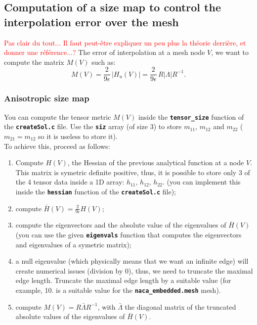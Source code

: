 \documentclass{article}
\newcommand{\ttb}[1]{\texttt{\textbf{#1}}}
\begin{document}
\subsection{Computation of a size map to control the interpolation error over the mesh}

\textcolor{red}{Pas clair du tout... Il faut peut-\^etre expliquer un peu plus la th\'eorie derri\`ere, et donner une r\'ef\'erence...?}
The error of interpolation at a mesh node $V$, we want to compute
the matrix $M(V)$ such as:
$$
M(V) = \frac{2}{9\epsilon} \, \left | H_u(V) \right | = \frac{2}{9\epsilon} \, R
\left |\Lambda\right | R^{-1}.
$$

\subsubsection{Anisotropic size map}
You can compute the tensor metric $M(V)$ inside the \ttb{tensor\_size}
function of the \ttb{createSol.c} file. Use the \ttb{siz} array (of
size 3) to store $m_{11}$, $m_{12}$ and $m_{22}$ ($m_{21} = m_{12}$ so
it is useless to store it).\\

To achieve this, proceed as follows:

\begin{enumerate}
\item Compute $H(V)$, the Hessian of the previous analytical function
  at a node $V$. This matrix is symetric definite positive, thus, it
  is possible to store only 3 of the 4 tensor data inside a 1D array:
  $h_{11},\,h_{12},\,h_{22}$. (you can implement this
  inside the \ttb{hessian} function of the \ttb{createSol.c} file);
\item compute $\bar{H}(V) = \frac{2}{9\epsilon}H(V)$;
\item compute the eigenvectors and the absolute value of the
  eigenvalues of $\bar{H}(V)$ (you can use the given \ttb{eigenvals}
  function that computes the eigenvectors and eigenvalues of a
  symetric matrix);
\item a null eigenvalue (which physically means that we want an
  infinite edge) will create numerical issues (division by 0), thus, we
  need to truncate the maximal edge length. Truncate the maximal edge
  length by a suitable value (for example, 10. is a suitable value for
  the \ttb{naca\_embedded.mesh} mesh).
\item compute $M(V) = R \bar{\Lambda} R^{-1}$, with
  $\bar{\Lambda}$ the diagonal matrix of the truncated absolute values
  of the eigenvalues of $\bar{H}(V)$.
\end{enumerate}
\end{document}
